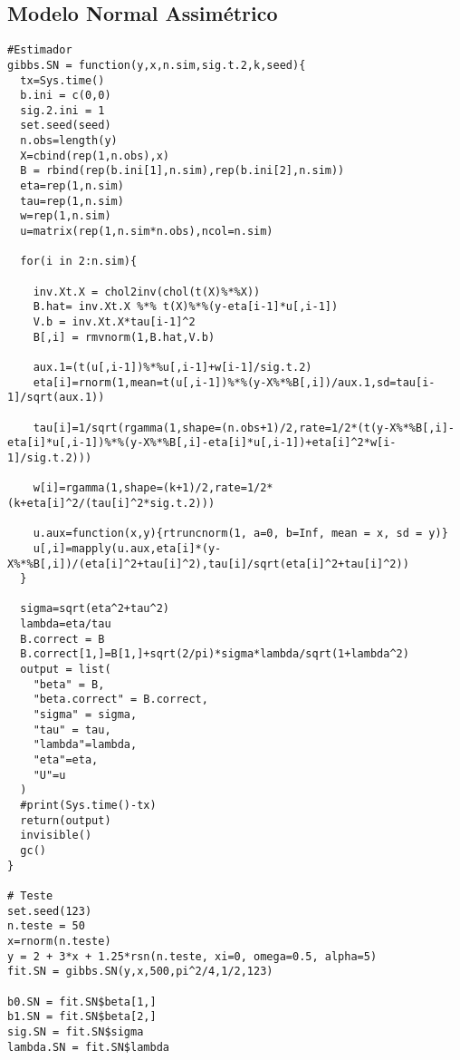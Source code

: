 \subsection{Modelo Normal Assimétrico}
\begin{lstlisting}
#Estimador
gibbs.SN = function(y,x,n.sim,sig.t.2,k,seed){
  tx=Sys.time()
  b.ini = c(0,0)
  sig.2.ini = 1
  set.seed(seed)
  n.obs=length(y)
  X=cbind(rep(1,n.obs),x)
  B = rbind(rep(b.ini[1],n.sim),rep(b.ini[2],n.sim))
  eta=rep(1,n.sim)
  tau=rep(1,n.sim)
  w=rep(1,n.sim)
  u=matrix(rep(1,n.sim*n.obs),ncol=n.sim)
  
  for(i in 2:n.sim){
    
    inv.Xt.X = chol2inv(chol(t(X)%*%X))
    B.hat= inv.Xt.X %*% t(X)%*%(y-eta[i-1]*u[,i-1])
    V.b = inv.Xt.X*tau[i-1]^2
    B[,i] = rmvnorm(1,B.hat,V.b)
    
    aux.1=(t(u[,i-1])%*%u[,i-1]+w[i-1]/sig.t.2)
    eta[i]=rnorm(1,mean=t(u[,i-1])%*%(y-X%*%B[,i])/aux.1,sd=tau[i-1]/sqrt(aux.1))
    
    tau[i]=1/sqrt(rgamma(1,shape=(n.obs+1)/2,rate=1/2*(t(y-X%*%B[,i]-eta[i]*u[,i-1])%*%(y-X%*%B[,i]-eta[i]*u[,i-1])+eta[i]^2*w[i-1]/sig.t.2)))
    
    w[i]=rgamma(1,shape=(k+1)/2,rate=1/2*(k+eta[i]^2/(tau[i]^2*sig.t.2)))
    
    u.aux=function(x,y){rtruncnorm(1, a=0, b=Inf, mean = x, sd = y)}
    u[,i]=mapply(u.aux,eta[i]*(y-X%*%B[,i])/(eta[i]^2+tau[i]^2),tau[i]/sqrt(eta[i]^2+tau[i]^2))
  }  
  
  sigma=sqrt(eta^2+tau^2)
  lambda=eta/tau
  B.correct = B
  B.correct[1,]=B[1,]+sqrt(2/pi)*sigma*lambda/sqrt(1+lambda^2)
  output = list(
    "beta" = B,
    "beta.correct" = B.correct,
    "sigma" = sigma,
    "tau" = tau,
    "lambda"=lambda,
    "eta"=eta,
    "U"=u
  )
  #print(Sys.time()-tx)
  return(output)
  invisible()
  gc()
}

# Teste
set.seed(123)
n.teste = 50
x=rnorm(n.teste)
y = 2 + 3*x + 1.25*rsn(n.teste, xi=0, omega=0.5, alpha=5)
fit.SN = gibbs.SN(y,x,500,pi^2/4,1/2,123)

b0.SN = fit.SN$beta[1,]
b1.SN = fit.SN$beta[2,]
sig.SN = fit.SN$sigma
lambda.SN = fit.SN$lambda
\end{lstlisting}

